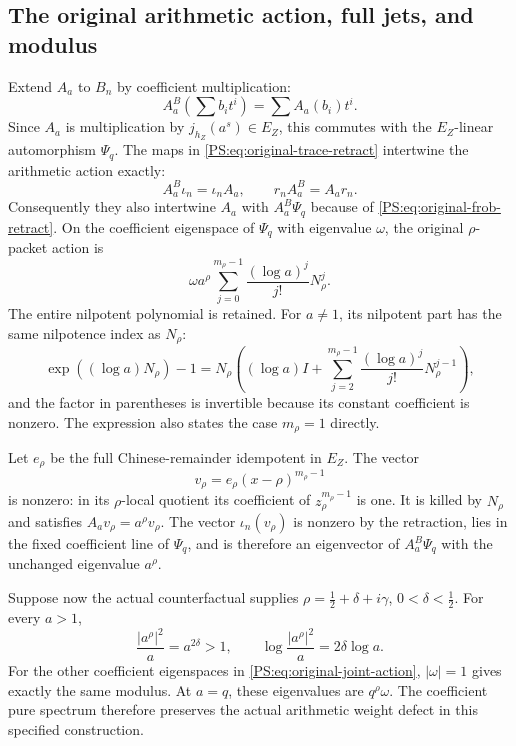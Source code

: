 \subsection{The original arithmetic action, full jets, and modulus}

Extend $A_a$ to $B_n$ by coefficient multiplication:
\[
 A_a^{B}\left(\sum b_it^i\right)=\sum A_a(b_i)t^i.
\]
Since $A_a$ is multiplication by $j_{h_Z}(a^s)\in E_Z$,
this commutes with the $E_Z$-linear automorphism $\Psi_q$.
The maps in \eqref{PS:eq:original-trace-retract} intertwine the
arithmetic action exactly:
\[
 A_a^B\iota_n=\iota_n A_a,\qquad
 r_n A_a^B=A_a r_n.
\]
Consequently they also intertwine $A_a$ with
$A_a^B\Psi_q$ because of \eqref{PS:eq:original-frob-retract}.
On the coefficient eigenspace of $\Psi_q$ with eigenvalue
$\omega$, the original $\rho$-packet action is
\begin{equation}
 \omega a^\rho
 \sum_{j=0}^{m_\rho-1}\frac{(\log a)^j}{j!}N_\rho^j.
 \label{PS:eq:original-joint-action}
\end{equation}
The entire nilpotent polynomial is retained. For $a\ne1$, its
nilpotent part has the same nilpotence index as $N_\rho$:
\[
 \exp((\log a)N_\rho)-1
 =N_\rho\left((\log a)I+
 \sum_{j=2}^{m_\rho-1}\frac{(\log a)^j}{j!}N_\rho^{j-1}\right),
\]
and the factor in parentheses is invertible because its constant
coefficient is nonzero. The expression also states the case
$m_\rho=1$ directly.

Let $e_\rho$ be the full Chinese-remainder idempotent in $E_Z$.
The vector
\[
 v_\rho=e_\rho(x-\rho)^{m_\rho-1}
\]
is nonzero: in its $\rho$-local quotient its coefficient of
$z_\rho^{m_\rho-1}$ is one. It is killed by $N_\rho$ and satisfies
$A_av_\rho=a^\rho v_\rho$. The vector $\iota_n(v_\rho)$ is
nonzero by the retraction, lies in the fixed coefficient line of
$\Psi_q$, and is therefore an eigenvector of $A_a^B\Psi_q$ with
the unchanged eigenvalue $a^\rho$.

Suppose now the actual counterfactual supplies
$\rho=\tfrac12+\delta+i\gamma$, $0<\delta<\tfrac12$.
For every $a>1$,
\begin{equation}
 \frac{|a^\rho|^2}{a}=a^{2\delta}>1,
 \qquad
 \log\frac{|a^\rho|^2}{a}=2\delta\log a.
 \label{PS:eq:original-surviving-defect}
\end{equation}
For the other coefficient eigenspaces in
\eqref{PS:eq:original-joint-action}, $|\omega|=1$ gives exactly the
same modulus. At $a=q$, these eigenvalues are $q^\rho\omega$.
The coefficient pure spectrum therefore preserves the actual
arithmetic weight defect in this specified construction.

